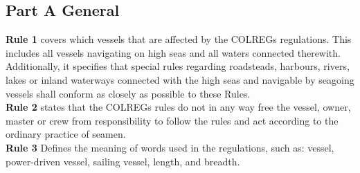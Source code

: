 \subsection{Part A General}
\textbf{Rule 1} covers which vessels that are affected by the COLREGs regulations. This includes all vessels navigating on high seas and all waters connected therewith.
Additionally, it specifies that special rules regarding roadsteads, harbours, rivers, lakes or inland waterways connected with the high seas and navigable by seagoing vessels shall conform as closely as possible to these Rules.
\\
\textbf{Rule 2} states that the COLREGs rules do not in any way free the vessel, owner, master or crew from responsibility to follow the rules and act according to the ordinary practice of seamen.
\\
\textbf{Rule 3} Defines the meaning of words used in the regulations, such as: vessel, power-driven vessel, sailing vessel, length, and breadth.
